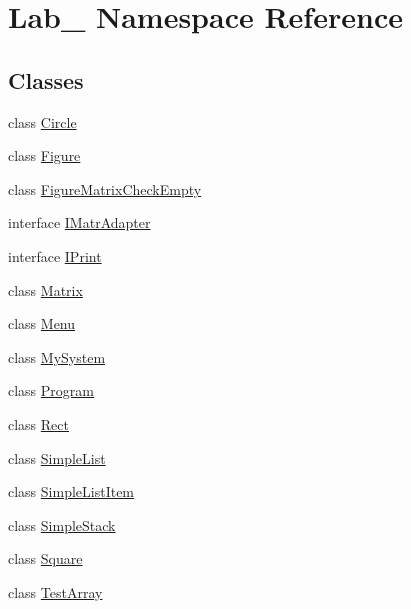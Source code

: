 \hypertarget{namespace_lab__3}{}\section{Lab\+\_ Namespace Reference}
\label{namespace_lab__3}
\subsection*{Classes}
\begin{DoxyCompactItemize}
\item 
class \hyperlink{class_lab__3_1_1_circle}{Circle}
\item 
class \hyperlink{class_lab__3_1_1_figure}{Figure}
\item 
class \hyperlink{class_lab__3_1_1_figure_matrix_check_empty}{Figure\+Matrix\+Check\+Empty}
\item 
interface \hyperlink{interface_lab__3_1_1_i_matr_adapter}{I\+Matr\+Adapter}
\item 
interface \hyperlink{interface_lab__3_1_1_i_print}{I\+Print}
\item 
class \hyperlink{class_lab__3_1_1_matrix}{Matrix}
\item 
class \hyperlink{class_lab__3_1_1_menu}{Menu}
\item 
class \hyperlink{class_lab__3_1_1_my_system}{My\+System}
\item 
class \hyperlink{class_lab__3_1_1_program}{Program}
\item 
class \hyperlink{class_lab__3_1_1_rect}{Rect}
\item 
class \hyperlink{class_lab__3_1_1_simple_list}{Simple\+List}
\item 
class \hyperlink{class_lab__3_1_1_simple_list_item}{Simple\+List\+Item}
\item 
class \hyperlink{class_lab__3_1_1_simple_stack}{Simple\+Stack}
\item 
class \hyperlink{class_lab__3_1_1_square}{Square}
\item 
class \hyperlink{class_lab__3_1_1_test_array}{Test\+Array}
\end{DoxyCompactItemize}
